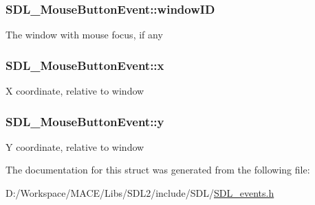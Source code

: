 \subsubsection[{\texorpdfstring{window\+ID}{windowID}}]{ S\+D\+L\+\_\+\+Mouse\+Button\+Event\+::window\+ID}\hypertarget{struct_s_d_l___mouse_button_event_ab3b855d4b543b5d02fcf5d56e4421393}{}\label{struct_s_d_l___mouse_button_event_ab3b855d4b543b5d02fcf5d56e4421393}
The window with mouse focus, if any 
\subsubsection[{\texorpdfstring{x}{x}}]{ S\+D\+L\+\_\+\+Mouse\+Button\+Event\+::x}\hypertarget{struct_s_d_l___mouse_button_event_a5bb9c61b86e999f58637511e32e3a076}{}\label{struct_s_d_l___mouse_button_event_a5bb9c61b86e999f58637511e32e3a076}
X coordinate, relative to window 
\subsubsection[{\texorpdfstring{y}{y}}]{ S\+D\+L\+\_\+\+Mouse\+Button\+Event\+::y}\hypertarget{struct_s_d_l___mouse_button_event_a7ccb5c55a7ddadce723f4ea6d5269540}{}\label{struct_s_d_l___mouse_button_event_a7ccb5c55a7ddadce723f4ea6d5269540}
Y coordinate, relative to window 

The documentation for this struct was generated from the following file\+:\begin{DoxyCompactItemize}
\item 
D\+:/\+Workspace/\+M\+A\+C\+E/\+Libs/\+S\+D\+L2/include/\+S\+D\+L/\hyperlink{_s_d_l__events_8h}{S\+D\+L\+\_\+events.\+h}\end{DoxyCompactItemize}
